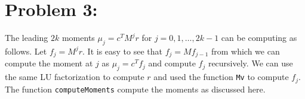 
\section*{Problem 3:}

The leading $2k$ moments $\mu_{j} = c^{T}M^{j}r$ for $j=0,1,\dots, 2k-1$ can be computing as follows. Let $f_{j} = M^{j}r$. It is easy to see that $f_{j} = Mf_{j-1}$ from which we can compute the moment at $j$ as $\mu_{j}=c^{T}f_{j}$ and compute $f_{j}$ recursively. We can use the same LU factorization to compute $r$ and used the function \texttt{Mv} to compute $f_{j}$. The function \texttt{computeMoments} compute the moments as discussed here. 

